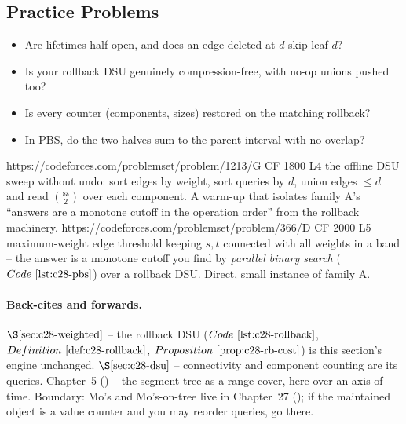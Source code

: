 \subsection{Practice Problems}

\begin{stuckbox}
\begin{itemize}[nosep, leftmargin=1.4em]
  \item Are lifetimes half-open, and does an edge deleted at \(d\) skip leaf \(d\)?
  \item Is your rollback DSU genuinely compression-free, with no-op unions
        pushed too?
  \item Is every counter (components, sizes) restored on the matching rollback?
  \item In PBS, do the two halves sum to the parent interval with no overlap?
\end{itemize}
\end{stuckbox}

\begin{practiceset}
    {https://codeforces.com/problemset/problem/1213/G}
    {CF 1800 L4}
    {the offline DSU sweep without undo: sort edges by weight, sort queries by
     \(d\), union edges \(\le d\) and read \(\binom{\text{sz}}{2}\) over each
     component.  A warm-up that isolates family A's ``answers are a monotone
     cutoff in the operation order'' from the rollback machinery.}
    {https://codeforces.com/problemset/problem/366/D}
    {CF 2000 L5}
    {maximum-weight edge threshold keeping \(s,t\) connected with all weights in
     a band -- the answer is a monotone cutoff you find by
     \emph{parallel binary search} (\(\coderef{c28-pbs}\)) over a rollback DSU.
     Direct, small instance of family A.}
\end{practiceset}

\paragraph{Back-cites and forwards.}
\(\secref{c28-weighted}\) -- the rollback DSU (\(\coderef{c28-rollback}\),
\(\defref{c28-rollback}\), \(\propref{c28-rb-cost}\)) is this section's engine
unchanged.  \(\secref{c28-dsu}\) -- connectivity and component counting are its
queries.  Chapter~5 () -- the segment tree as a range cover, here over
an axis of time.  Boundary: Mo's and Mo's-on-tree live in Chapter~27
(); if the maintained object is a value counter and you may reorder
queries, go there.

